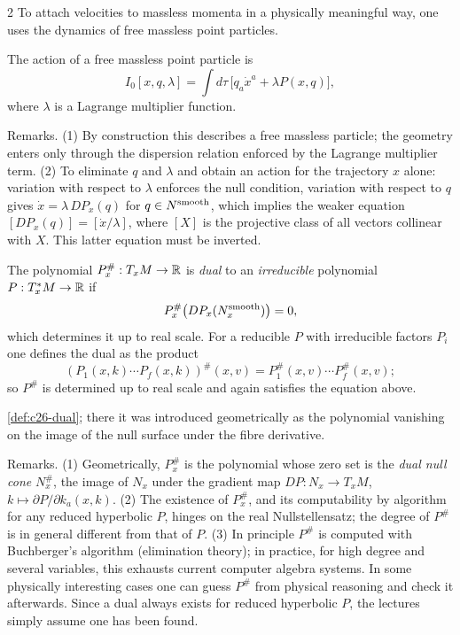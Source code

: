 \begin{paracol}{2}
To attach velocities to massless momenta in a physically meaningful way, one uses the dynamics of free massless point particles.

\begin{theorem}\label{thm:c29-massless}
The action of a free massless point particle is
\[
  I_0[x,q,\lambda]=\int d\tau\,\bigl[q_a\dot x^a+\lambda P(x,q)\bigr],
\]
where $\lambda$ is a Lagrange multiplier function.
\end{theorem}

Remarks. (1) By construction this describes a free massless particle; the geometry enters only through the dispersion relation enforced by the Lagrange multiplier term. (2) To eliminate $q$ and $\lambda$ and obtain an action for the trajectory $x$ alone: variation with respect to $\lambda$ enforces the null condition, variation with respect to $q$ gives $\dot x=\lambda\,DP_x(q)$ for $q\in N^{\rm smooth}$, which implies the weaker equation $[DP_x(q)]=[\dot x/\lambda]$, where $[X]$ is the projective class of all vectors collinear with $X$. This latter equation must be inverted.

\begin{definition}\label{def:c29-dual}
The polynomial $P^\#_x:T_xM\to\mathbb{R}$ is \emph{dual} to an \emph{irreducible} polynomial $P:T^*_xM\to\mathbb{R}$ if
\[
  P^\#_x\bigl(DP_x(N^{\rm smooth}_x)\bigr)=0,
\]
which determines it up to real scale. For a reducible $P$ with irreducible factors $P_i$ one defines the dual as the product
\[
  (P_1(x,k)\cdots P_f(x,k))^\#(x,v)=P_1^\#(x,v)\cdots P_f^\#(x,v);
\]
so $P^\#$ is determined up to real scale and again satisfies the equation above.
\end{definition}
\begin{recall}
\cref{def:c26-dual}; there it was introduced geometrically as the polynomial vanishing on the image of the null surface under the fibre derivative.
\end{recall}

Remarks. (1) Geometrically, $P^\#_x$ is the polynomial whose zero set is the \emph{dual null cone} $N^\#_x$, the image of $N_x$ under the gradient map $DP:N_x\to T_xM$, $k\mapsto\partial P/\partial k_a(x,k)$. (2) The existence of $P^\#_x$, and its computability by algorithm for any reduced hyperbolic $P$, hinges on the real Nullstellensatz; the degree of $P^\#$ is in general different from that of $P$. (3) In principle $P^\#$ is computed with Buchberger's algorithm (elimination theory); in practice, for high degree and several variables, this exhausts current computer algebra systems. In some physically interesting cases one can guess $P^\#$ from physical reasoning and check it afterwards. Since a dual always exists for reduced hyperbolic $P$, the lectures simply assume one has been found.


\end{paracol}
